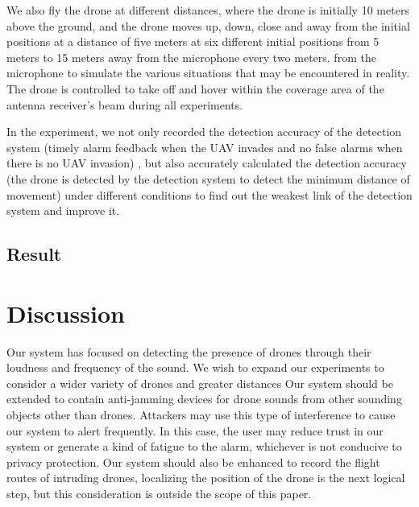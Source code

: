 \documentclass{sig-alternate-10pt}
\begin{document}
\hspace{1mm} 
We also fly the drone at different distances, where the drone is initially 10 meters above the ground, and the drone moves up, down, close and away from the initial positions at a distance of five meters at six different initial positions from 5 meters to 15 meters away from the microphone every two meters. from the microphone to simulate the various situations that may be encountered in reality. The drone is controlled to take off and hover within the coverage area of the antenna receiver’s beam during all experiments.

In the experiment, we not only recorded the detection accuracy of the detection system (timely alarm feedback when the UAV invades and no false alarms when there is no UAV invasion) , but also accurately calculated the detection accuracy (the drone is detected by the detection system to detect the minimum distance of movement) under different conditions to find out the weakest link of the detection system and improve it.



\subsection{Result}



\section{Discussion}

Our system has focused on detecting the presence of drones through their loudness and frequency of the sound. We wish to expand our experiments to consider a wider variety of drones and greater distances Our system should be extended to contain anti-jamming devices for drone sounds from other sounding objects other than drones. Attackers may use this type of interference to cause our system to alert frequently. In this case, the user may reduce trust in our system or generate a kind of fatigue to the alarm, whichever is not conducive to privacy protection. Our system should also be enhanced to record the flight routes of intruding drones, localizing the position of the drone is the next logical step, but this consideration is outside the scope of this paper.
\end{document}

